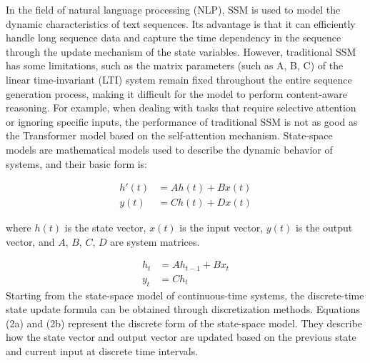 \documentclass{article}
\theoremstyle{plain}
\theoremstyle{definition}
\theoremstyle{remark}
\begin{document}
In the field of natural language processing (NLP), SSM is used to model the dynamic characteristics of text sequences. Its advantage is that it can efficiently handle long sequence data and capture the time dependency in the sequence through the update mechanism of the state variables. However, traditional SSM has some limitations, such as the matrix parameters (such as A, B, C) of the linear time-invariant (LTI) system remain fixed throughout the entire sequence generation process, making it difficult for the model to perform content-aware reasoning. For example, when dealing with tasks that require selective attention or ignoring specific inputs, the performance of traditional SSM is not as good as the Transformer model based on the self-attention mechanism.
State-space models are mathematical models used to describe the dynamic behavior of systems, and their basic form is:

\begin{equation}
\begin{aligned}
   h'(t) &= Ah(t) + Bx(t) \\
   y(t) &= Ch(t) + Dx(t)
\end{aligned}
\end{equation}

where $h(t)$ is the state vector, $x(t)$ is the input vector, $y(t)$ is the output vector, and $A$, $B$, $C$, $D$ are system matrices.

\begin{equation}
\begin{aligned}
   h_t &= Ah_{t-1} + Bx_t \\
   y_t &= Ch_t
\end{aligned}
\label{eq:state_space}
\end{equation}
Starting from the state-space model of continuous-time systems, the discrete-time state update formula can be obtained through discretization methods. Equations (2a) and (2b) represent the discrete form of the state-space model. They describe how the state vector and output vector are updated based on the previous state and current input at discrete time intervals.
\end{document}

